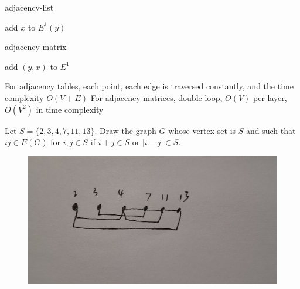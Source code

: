 \documentclass[a4paper, justified]{tufte-handout}
\begin{document}
\begin{solution}
    \noindent
    \begin{algorithm}
        \caption{adjacency-list}\label{euclid}
        \begin{algorithmic}[1]
            \State add $x$ to $E^{1}(y)$
            \EndFor
            \EndFor
            \EndProcedure
        \end{algorithmic}
    \end{algorithm}
    \noindent
    \noindent
    \begin{algorithm}
        \caption{adjacency-matrix}\label{euclid}
        \begin{algorithmic}[1]
            \State add $(y,x)$ to $E^{1}$
            \EndIf
            \EndFor
            \EndFor
            \EndProcedure
        \end{algorithmic}
    \end{algorithm}
    \noindent
    For adjacency tables, each point, each edge is traversed constantly, and the time complexity $O(V+E)$
    For adjacency matrices, double loop, $O(V)$ per layer, $O(V^2)$ in time complexity
\end{solution}

\begin{problem}[3-4.2 CZ 1.3]
Let $S = \{2, 3, 4, 7, 11, 13\}$. Draw the graph $G$ whose vertex set is $S$ and such that $ij \in E (G)$ for $i, j \in S$ if $i + j \in S$ or $|i − j| \in S$.
\end{problem}

\begin{solution}
    \begin{figure}[htbp]
        \centering
        \includegraphics[width = 0.75\linewidth]{fig.jpg}
    \end{figure}

\end{solution}
\end{document}
